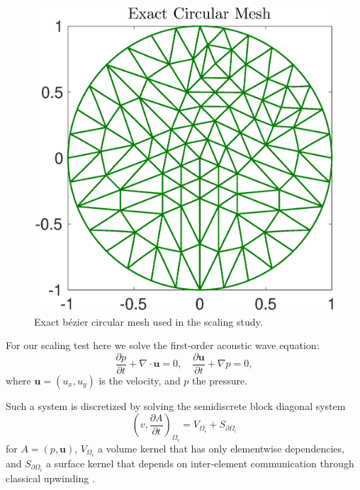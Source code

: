 \begin{figure}
\begin{center}
\includegraphics[width=0.8\linewidth]{./bidg_data/168_circ}
\end{center}
\vspace*{-.5cm}
\caption{Exact b\'{e}zier circular mesh used in the scaling study.}
\label{fig:168_circ}
\end{figure}

For our scaling test here we solve the first-order acoustic wave equation:
\begin{equation}
  \label{awe}
  \frac{\partial p}{\partial t} + \nabla\cdot \boldsymbol{u} = 0, \quad
  \frac{\partial\boldsymbol{u}}{\partial t} + \nabla p = 0,
\end{equation}
where $\boldsymbol{u}=(u_x,u_y)$ is the velocity, and $p$ the pressure.

Such a system is discretized by solving the semidiscrete block diagonal system
\[
  \left( v, \frac{ \partial A}{\partial t} \right)_{\Omega_{i}} =
  V_{\Omega_{i}}+S_{\partial\Omega_{i}}
\]
for $A = (p,\boldsymbol{u})$, $V_{\Omega_{i}}$ a volume kernel that has only
elementwise dependencies, and $S_{\partial\Omega_{i}}$ a surface kernel that
depends on inter-element communication through classical upwinding
\cite{Michoski2014898}.

